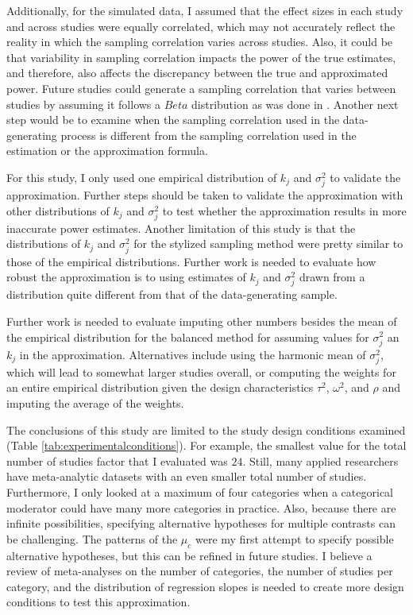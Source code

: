 Additionally, for the simulated data, I assumed that the effect sizes in each study and across studies were equally correlated, which may not accurately reflect the reality in which the sampling correlation varies across studies. Also, it could be that variability in sampling correlation impacts the power of the true estimates, and therefore, also affects the discrepancy between the true and approximated power. Future studies could generate a sampling correlation that varies between studies by assuming it follows a $Beta$ distribution as was done in \textcite{tipton2015b, joshi_cluster_2022, vembye2023}. Another next step would be to examine when the sampling correlation used in the data-generating process is different from the sampling correlation used in the estimation or the approximation formula.

For this study, I only used one empirical distribution of $k_j$ and $\sigma_j^2$ to validate the approximation. Further steps should be taken to validate the approximation with other distributions of $k_j$ and $\sigma_j^2$ to test whether the approximation results in more inaccurate power estimates.  Another limitation of this study is that the distributions of $k_j$ and $\sigma_j^2$ for the stylized sampling method were pretty similar to those of the empirical distributions. Further work is needed to evaluate how robust the approximation is to using estimates of $k_j$ and $\sigma_j^2$ drawn from a distribution quite different from that of the data-generating sample. 

Further work is needed to evaluate imputing other numbers besides the mean of the empirical distribution for the balanced method for assuming values for $\sigma_j^2$ an $k_j$ in the approximation. Alternatives include using the harmonic mean of $\sigma_j^2$, which will lead to somewhat larger studies overall, or computing the weights for an entire empirical distribution given the design characteristics $\tau^2$, $\omega^2$, and $\rho$ and imputing the average of the weights. 

The conclusions of this study are limited to the study design conditions examined (Table \ref{tab:experimentalconditions}). For example, the smallest value for the total number of studies factor that I evaluated was $24$. Still, many applied researchers have meta-analytic datasets with an even smaller total number of studies. Furthermore, I only looked at a maximum of four categories when a categorical moderator could have many more categories in practice. Also, because there are infinite possibilities, specifying alternative hypotheses for multiple contrasts can be challenging. The patterns of the $\mu_c$ were my first attempt to specify possible alternative hypotheses, but this can be refined in future studies. I believe a review of meta-analyses on the number of categories, the number of studies per category, and the distribution of regression slopes is needed to create more design conditions to test this approximation. 

